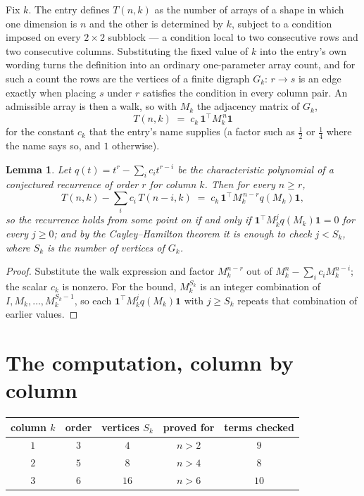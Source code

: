 \documentclass[11pt,a4paper]{article}
\theoremstyle{plain}
\newtheorem{lemma}[theorem]{Lemma}
\theoremstyle{definition}
\begin{document}
Fix $k$. The entry defines $T(n,k)$ as the number of arrays of a shape in which one dimension
is $n$ and the other is determined by $k$, subject to a condition imposed on every
$2\times2$ subblock --- a condition local to two consecutive rows and two consecutive columns.
Substituting the fixed value of $k$ into the entry's own wording turns the definition into an
ordinary one-parameter array count, and for such a count the rows are the vertices of a finite
digraph $G_k$: $r\to s$ is an edge exactly when placing $s$ under $r$ satisfies the condition
in every column pair. An admissible array is then a walk, so with $M_k$ the adjacency matrix
of $G_k$,
\[
T(n,k)\;=\;c_k\,\mathbf{1}^{\!\top}M_k^{\,n}\mathbf{1}
\]
for the constant $c_k$ that the entry's name supplies (a factor such as $\tfrac12$ or
$\tfrac14$ where the name says so, and $1$ otherwise).

\begin{lemma}\label{lem:crit}
Let $q(t)=t^{r}-\sum_i c_it^{r-i}$ be the characteristic polynomial of a conjectured
recurrence of order $r$ for column $k$. Then for every $n\ge r$,
\[
T(n,k)-\sum_i c_i\,T(n-i,k)\;=\;c_k\,\mathbf{1}^{\!\top}M_k^{\,n-r}q(M_k)\mathbf{1},
\]
so the recurrence holds from some point on if and only if
$\mathbf{1}^{\!\top}M_k^{j}q(M_k)\mathbf{1}=0$ for every $j\ge0$; and by the
Cayley--Hamilton theorem it is enough to check $j<S_k$, where $S_k$ is the number of vertices
of $G_k$.
\end{lemma}

\begin{proof}
Substitute the walk expression and factor $M_k^{n-r}$ out of $M_k^{n}-\sum_ic_iM_k^{n-i}$;
the scalar $c_k$ is nonzero. For the bound, $M_k^{S_k}$ is an integer combination of
$I,M_k,\dots,M_k^{S_k-1}$, so each $\mathbf{1}^{\!\top}M_k^{j}q(M_k)\mathbf{1}$ with
$j\ge S_k$ repeats that combination of earlier values.
\end{proof}

\section{The computation, column by column}

\begin{center}
\begin{tabular}{ccccc}
column $k$ & order & vertices $S_k$ & proved for & terms checked \\ \hline
$1$ & $3$ & $4$ & $n>2$ & $9$ \\
$2$ & $5$ & $8$ & $n>4$ & $8$ \\
$3$ & $6$ & $16$ & $n>6$ & $10$ \\
\end{tabular}
\end{center}
\end{document}
